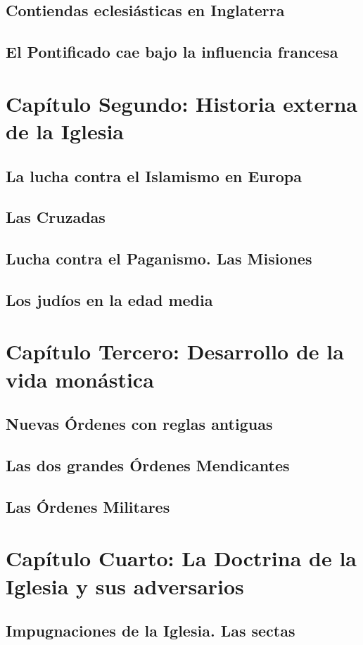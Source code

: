\raggedbottom{} \documentclass[12pt]{book}
\begin{document}
\section{Contiendas eclesiásticas en Inglaterra}
\section{El Pontificado cae bajo la influencia francesa}
\chapter{Capítulo Segundo: Historia externa de  la Iglesia}
\section{La lucha contra el Islamismo en Europa}
\section{Las Cruzadas}
\section{Lucha contra el Paganismo. Las Misiones}
\section{Los judíos en la edad media}
\chapter{Capítulo Tercero: Desarrollo de la vida monástica}
\section{Nuevas Órdenes con reglas antiguas}
\section{Las dos grandes Órdenes Mendicantes}
\section{Las Órdenes Militares}
\chapter{Capítulo Cuarto: La Doctrina de la Iglesia y sus adversarios}
\section{Impugnaciones de la Iglesia. Las sectas}
\end{document}
